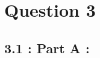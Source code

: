 \documentclass[12pt, a4paper]{article}
\begin{document}
\vspace*{-22pt}
\section*{Question 3}
\subsection*{3.1 : Part A : }
\end{document}
